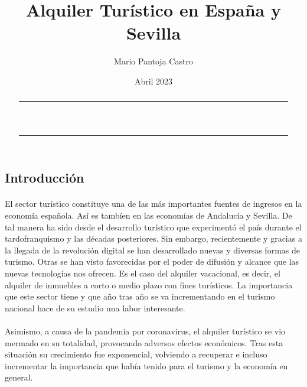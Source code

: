 \documentclass[a4paper,10pt]{article}
\title{Alquiler Turístico en España y Sevilla}
\author{Mario Pantoja Castro}
\date{Abril 2023}
\begin{document}
    \maketitle

    \begin{abstract}

        \hrule
        \ \\
   
        \ \\
        \hrule
    \end{abstract}

    \vspace{3mm}

    \setlength{\columnsep}{0.88cm}
    \begin{multicols}{2}
    
        \section{Introducción}

            \paragraph*{}
            El sector turístico constituye una de las más importantes fuentes de ingresos en la economía española. Así es tambíen en las economías de Andalucía y
            Sevilla. De tal manera ha sido desde el desarrollo turístico que experimentó el país durante el tardofranquismo y las décadas posteriores. Sin embargo, 
            recientemente y gracias a la llegada de la revolución digital se han desarrollado nuevas y diversas formas de turismo. Otras se han visto favorecidas
            por el poder de difusión y alcance que las nuevas tecnologías nos ofrecen. Es el caso del alquiler vacacional, es decir, el alquiler de inmuebles a
            corto o medio plazo con fines turísticos. La importancia que este sector tiene y que año tras año se va incrementando en el turismo nacional hace de 
            su estudio una labor interesante.
            
            \paragraph*{}
            Asimismo, a causa de la pandemia por coronavirus, el alquiler turístico se vio mermado en su totalidad, 
            provocando adversos efectos económicos. Tras esta situación su crecimiento fue exponencial, volviendo a recuperar e incluso incrementar la importancia
            que había tenido para el turismo y la economía en general.


\end{multicols}
\end{document}
